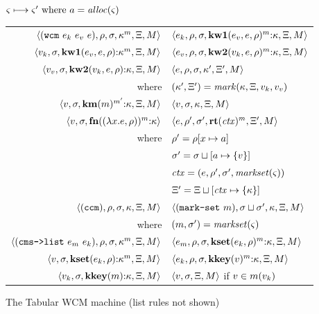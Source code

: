 {%
\begin{figure}
  \centering
  $\varsigma \longmapsto \varsigma' \text{ where } a = \mathit{alloc}(\varsigma)$ \\
  \begin{tabular}{r|l}
    \hline
    $\langle (\texttt{wcm}\ e_k\ e_v\ e), \rho, \sigma, \kappa^m, \Xi, M \rangle$
    &
    $\langle e_k, \rho, \sigma, \mathbf{kw1}(e_v,e,\rho)^m{\tt :} \kappa, \Xi, M \rangle$
    \\
    $\langle v_k, \sigma, \mathbf{kw1}(e_v,e,\rho){\tt :} \kappa^m, \Xi, M \rangle$
    &
    $\langle e_v, \rho, \sigma, \mathbf{kw2}(v_k,e,\rho)^m{\tt :} \kappa, \Xi, M \rangle$
    \\    
    $\langle v_v, \sigma, \mathbf{kw2}(v_k, e, \rho){\tt :} \kappa, \Xi, M \rangle$
    &
    $\langle e,\rho,\sigma,\kappa',\Xi', M \rangle$ \\
    where & $(\kappa',\Xi') = \mathit{mark}(\kappa,\Xi,v_k,v_v)$
    \\
   $\langle v,\sigma,\mathbf{km}(m)^{m'}{\tt :} \kappa, \Xi, M \rangle$
   &
   $\langle v,\sigma,\kappa,\Xi,M \rangle$
   \\
    $\langle v,\sigma,\mathbf{fn}{}((\lambda{} x. e, \rho))^m{\tt :} \kappa \rangle$
    &
    $\langle e, \rho', \sigma', \mathbf{rt}(\mathit{ctx})^m,\Xi',M \rangle$
    \\ where & $\rho' = \rho[x \mapsto a]$ \\
    & $\sigma' = \sigma\sqcup[a \mapsto \{ v \}]$ \\
    & $\mathit{ctx} = (e,\rho',\sigma', \mathit{markset}(\varsigma))$ \\
    & $\Xi' = \Xi\sqcup[\mathit{ctx} \mapsto \{ \kappa \}]$
    \\
    $\langle (\texttt{ccm}),\rho,\sigma,\kappa,\Xi,M \rangle$
    &
    $\langle (\texttt{mark-set}\ m),\sigma\sqcup\sigma',\kappa,\Xi,M \rangle$
    \\ where & $(m,\sigma') = \mathit{markset}(\varsigma)$
    \\
    $\langle (\texttt{cms->list}\ e_m\ e_k), \rho, \sigma, \kappa^m, \Xi, M \rangle$
    &
    $\langle e_m, \rho, \sigma, \mathbf{kset}(e_k,\rho)^m{\tt :} \kappa, \Xi, M \rangle$
    \\
    $\langle v, \sigma, \mathbf{kset}(e_k,\rho){\tt :} \kappa^m, \Xi, M \rangle$
    &
    $\langle e_k, \rho, \sigma, \mathbf{kkey}(v)^m{\tt :} \kappa, \Xi, M \rangle$
    \\
    $\langle v_k, \sigma, \mathbf{kkey}(m){\tt :} \kappa, \Xi, M \rangle$
    &
    $\langle v, \sigma, \Xi, M \rangle$ if $v \in m(v_k)$
  \end{tabular}  
  \caption{The Tabular WCM machine (list rules not shown)}
  \label{fig:wcm}
\end{figure}

}
